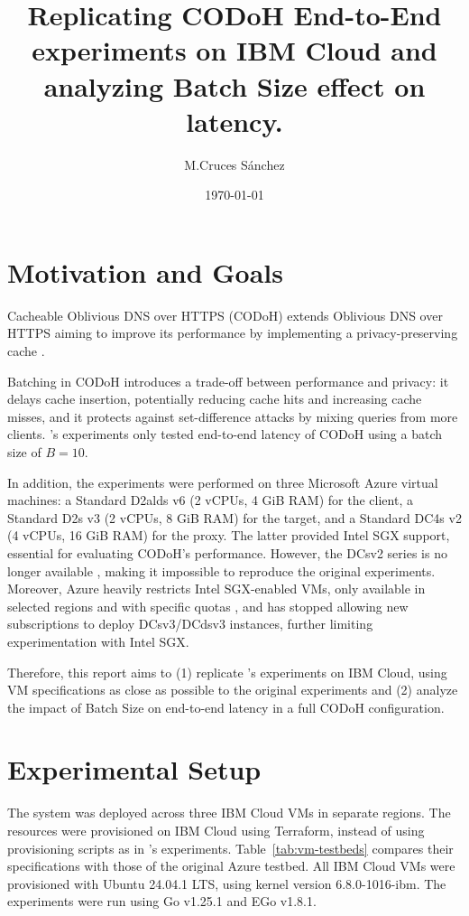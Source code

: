 \documentclass[a4paper]{article}
\author{M.Cruces Sánchez}
\title{Replicating CODoH End-to-End experiments on IBM Cloud and analyzing Batch Size effect on latency.}
\date{\today}
\begin{document}
\maketitle

\section{Motivation and Goals}

Cacheable Oblivious DNS over HTTPS (CODoH) extends Oblivious DNS over HTTPS aiming to improve its performance by implementing a privacy-preserving cache \citep{niroula2026codoh}.

Batching in CODoH introduces a trade-off between performance and privacy: it delays cache insertion, potentially reducing cache hits and increasing cache misses, and it protects against set-difference attacks by mixing queries from more clients. \citet{niroula2026codoh}'s experiments only tested end-to-end latency of CODoH using a batch size of $B=10$.

In addition, the experiments were performed on three Microsoft Azure virtual machines: a Standard D2alds v6 (2 vCPUs, 4 GiB RAM) for the client, a Standard D2s v3 (2 vCPUs, 8 GiB RAM) for the target, and a Standard DC4s v2 (4 vCPUs, 16 GiB RAM) for the proxy. The latter provided Intel SGX support, essential for evaluating CODoH's performance. However, the DCsv2 series is no longer available \citep{azure_dcsv2_retirement}, making it impossible to reproduce the original experiments. Moreover, Azure heavily restricts Intel SGX-enabled VMs, only available in selected regions and with specific quotas \citep{azure_sgx_deployment}, and \citet{azure_dcsv3_retirement} has stopped allowing new subscriptions to deploy DCsv3/DCdsv3 instances, further limiting experimentation with Intel SGX.

Therefore, this report aims to (1) replicate \citet{niroula2026codoh}'s experiments on IBM Cloud, using VM specifications as close as possible to the original experiments and (2) analyze the impact of Batch Size on end-to-end latency in a full CODoH configuration.

\section{Experimental Setup}

The system was deployed across three IBM Cloud VMs in separate regions. The resources were provisioned on IBM Cloud using Terraform, instead of using provisioning scripts as in \citet{niroula2026codoh}'s experiments. Table~\ref{tab:vm-testbeds} compares their specifications with those of the original Azure testbed. All IBM Cloud VMs were provisioned with Ubuntu 24.04.1 LTS, using kernel version 6.8.0-1016-ibm. The experiments were run using Go v1.25.1 and EGo v1.8.1.
\end{document}
